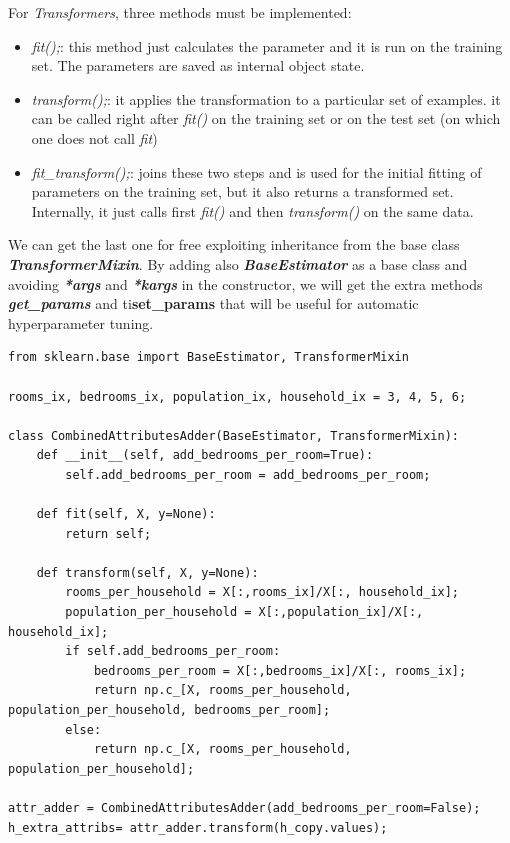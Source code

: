 \documentclass[12pt, letterpaper]{article}
\theoremstyle{definition}
\let\ti\textit
\let\tb\textbf
\begin{document}
For \ti{Transformers}, three methods must be implemented:
\begin{itemize}
\item\ti{fit();}: this method just calculates the parameter and it is run on the training set. The parameters are saved as internal object state.
\item \ti{transform();}: it applies the transformation to a particular set of examples. it can be called right after \ti{fit()} on the training set or on the test set (on which one does not call \ti{fit})
\item \ti{fit\_transform();}: joins these two steps and is used for the initial fitting of parameters on the training set, but it also returns a transformed set. Internally, it just calls first \ti{fit()} and then \ti{transform()} on the same data.
\end{itemize}
We can get the last one for free exploiting inheritance from the base class \ti{\tb{TransformerMixin}}. By adding also \ti{\tb{BaseEstimator}} as a base class and avoiding \ti\tb{*args} and \ti\tb{*kargs} in the constructor, we will get the extra methods \ti\tb{get\_params} and ti\tb{set\_params} that will be useful for automatic hyperparameter tuning.

\begin{lstlisting}[caption=Example of how to create a custom transformer.]
from sklearn.base import BaseEstimator, TransformerMixin

rooms_ix, bedrooms_ix, population_ix, household_ix = 3, 4, 5, 6;

class CombinedAttributesAdder(BaseEstimator, TransformerMixin):
    def __init__(self, add_bedrooms_per_room=True):
        self.add_bedrooms_per_room = add_bedrooms_per_room;

    def fit(self, X, y=None):
        return self;
    
    def transform(self, X, y=None):
        rooms_per_household = X[:,rooms_ix]/X[:, household_ix];
        population_per_household = X[:,population_ix]/X[:, household_ix];
        if self.add_bedrooms_per_room:
            bedrooms_per_room = X[:,bedrooms_ix]/X[:, rooms_ix];
            return np.c_[X, rooms_per_household, population_per_household, bedrooms_per_room];
        else:
            return np.c_[X, rooms_per_household, population_per_household];
        
attr_adder = CombinedAttributesAdder(add_bedrooms_per_room=False);
h_extra_attribs= attr_adder.transform(h_copy.values);
\end{lstlisting}
\end{document}
